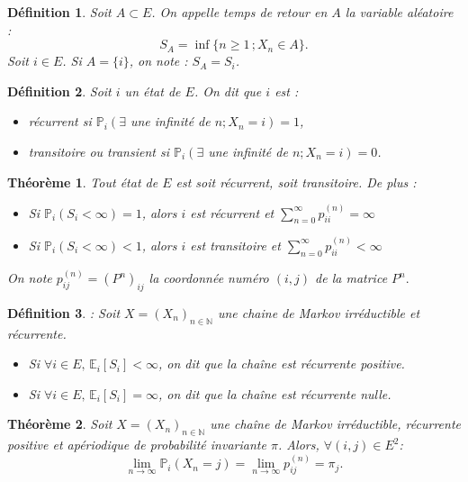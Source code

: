 \documentclass[12pt,a4paper]{report}
\newtheorem{thm}{Théorème}[section]
\newtheorem{definition}{Définition}[section]
\theoremstyle{remark}
\begin{document}
\begin{definition}\label{def2} 
Soit $A\subset E$. On appelle temps de retour en $A$ la variable aléatoire : $$S_A = \inf\{{n\geqslant 1} \, ; X_n \in A\}.$$
Soit $i \in E$. Si $A = \{i\}$, on note : $S_A = S_i$.
\end{definition}
\begin{definition}\label{defaaa}
Soit $i$ un état de $E$. On dit que $i$ est : 
\begin{itemize}
\item récurrent si  $\mathbb{P}_{i}\left(\exists\right.$ une infinité de $\left.n ; X_{n}=i\right)=1$,
\item transitoire ou transient si  $\mathbb{P}_{i}\left(\exists\right.$ une 
infinité de $\left.n ; X_{n}=i\right)=0$.
\end{itemize}
\end{definition}
\begin{thm}\label{th5}
Tout état de $E$ est soit récurrent, soit transitoire. De plus :
\begin{itemize}
    \item Si $\mathbb{P}_i(S_i<\infty)=1$, alors $i$ est récurrent et $\sum\limits_{n=0}^{\infty} p_{ii}^{(n)}=\infty$
     \item Si $\mathbb{P}_i(S_i<\infty)<1$, alors $i$ est transitoire et $\sum\limits_{n=0}^{\infty} p_{ii}^{(n)}<\infty$
\end{itemize}
On note $p_{i j}^{(n)}=\left(P^{n}\right)_{i j}$ la coordonnée numéro $(i, j)$ de la matrice $P^{n}.$
\end{thm}
\begin{definition}\label{def21}: Soit $X=\left(X_{n}\right)_{n \in \mathbb{N}}$ une chaine de Markov irréductible et récurrente.
\begin{itemize}
    \item Si $\forall i \in E, \, \mathbb{E}_{i}\left[S_{i}\right]<\infty$, on dit que la chaîne est récurrente positive. 
    \item Si $\forall i \in E, \, \mathbb{E}_{i}\left[S_{i}\right]=\infty$, on dit que la chaîne est récurrente nulle.
\end{itemize}
\end{definition}
\begin{thm}\label{th3}
Soit $X=(X_n)_{n \in \mathbb{N}}$ une chaîne de Markov irréductible, récurrente positive et apériodique de probabilité invariante $\pi$. Alors, $\forall (i,j) \in E^2$:
$$\lim\limits_{n \rightarrow \infty} \mathbb{P}_i(X_n = j) = \lim\limits_{n \rightarrow \infty} p^{(n)}_{ij} = \pi_j.$$
\end{thm}
\end{document}
